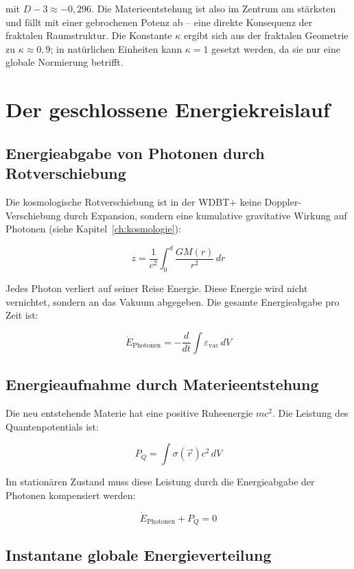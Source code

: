 mit \( D-3 \approx -0,296 \). Die Materieentstehung ist also im Zentrum am stärksten
und fällt mit einer gebrochenen Potenz ab – eine direkte Konsequenz der fraktalen
Raumstruktur. Die Konstante \( \kappa \) ergibt sich aus der fraktalen Geometrie zu
\( \kappa \approx 0,9 \); in natürlichen Einheiten kann \( \kappa = 1 \) gesetzt werden,
da sie nur eine globale Normierung betrifft.

\section{Der geschlossene Energiekreislauf}
\label{app:materieentstehung_kreislauf}

\subsection{Energieabgabe von Photonen durch Rotverschiebung}
\label{sub:materieentstehung_rotverschiebung}

Die kosmologische Rotverschiebung ist in der WDBT+ keine Doppler-Verschiebung
durch Expansion, sondern eine kumulative gravitative Wirkung auf Photonen
(siehe Kapitel~\ref{ch:kosmologie}):

\[
z = \frac{1}{c^2} \int_0^d \frac{GM(r)}{r^2} \, dr
\]

Jedes Photon verliert auf seiner Reise Energie. Diese Energie wird nicht vernichtet,
sondern an das Vakuum abgegeben. Die gesamte Energieabgabe pro Zeit ist:

\[
\dot{E}_{\text{Photonen}} = -\frac{d}{dt} \int \varepsilon_{\text{vac}} \, dV
\]

\subsection{Energieaufnahme durch Materieentstehung}
\label{sub:materieentstehung_aufnahme}

Die neu entstehende Materie hat eine positive Ruheenergie \( mc^2 \). Die
Leistung des Quantenpotentials ist:

\[
P_Q = \int \sigma(\vec{r}) c^2 \, dV
\]

Im stationären Zustand muss diese Leistung durch die Energieabgabe der Photonen
kompensiert werden:

\[
\dot{E}_{\text{Photonen}} + P_Q = 0
\]

\subsection{Instantane globale Energieverteilung}
\label{sub:materieentstehung_instantan}

